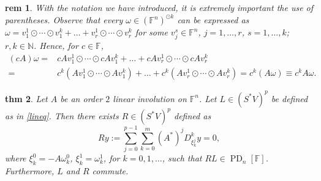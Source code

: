 \documentclass[a4paper,12pt,onecolumn]{article}
\theoremstyle{ptheorem}
\newtheorem{thm}{thm}[section]
\theoremstyle{hdef}
\newtheorem{rem}[thm]{rem}
\theoremstyle{premark}
\numberwithin{equation}{section}
\numberwithin{figure}{section}
\DeclareMathOperator{\PD}{PD}
\newcommand{\bF}{{\mathbb F}}
\newcommand{\bN}{{\mathbb N}}
\newcommand{\<}{\langle}
\renewcommand{\>}{\rangle}
\renewcommand{\<}{\left<}
\renewcommand{\>}{\right>}
\renewcommand{\(}{\left(}
\renewcommand{\)}{\right)}
\begin{document}
\begin{rem} With the notation we have introduced, it is extremely important the use of parentheses. Observe that every $\omega\in (\bF^n)^{\odot k}$ can be expressed as $\omega=v_1^1\odot \cdots\odot v^k_1+\dots +v_r^1\odot \cdots\odot v^k_r$ for some $v_j^s\in\bF^n$, $j=1,\dots,r$, $s=1,\dots,k$; $r,k\in\bN$. Hence, for $c\in\bF$,
\begin{align*}(cA)\omega= & cAv_1^1\odot \cdots\odot cA v^k_1+\dots +cAv_r^1\odot \cdots\odot cAv^k_r \\= &c^k(Av_1^1\odot \cdots\odot Av^k_1)+\dots +c^k(Av_r^1\odot \cdots\odot Av^k_r)=c^k(A\omega)\equiv c^kA\omega.\end{align*}
\end{rem}
\begin{thm}\label{theoremO2}
	Let $A$ be an order $2$ linear involution on $\bF^n$. Let $L\in(S^*V)^p$ be defined as in \eqref{lineq}. Then there exists $R\in(S^*V)^p$ defined as
	\[Ry:=\sum_{j=0}^{p-1}\sum_{k=0}^m(A^*)^jD^k_{\xi^j_k}y=0,\]
	where $\xi^0_k=-A\omega^0_k$, $\xi^1_k=\omega^1_k$, for $k=0,1,\dots$, such that $RL\in \PD_n[\bF]$. Furthermore, $L$ and $R$ commute.
\end{thm}
\end{document}
